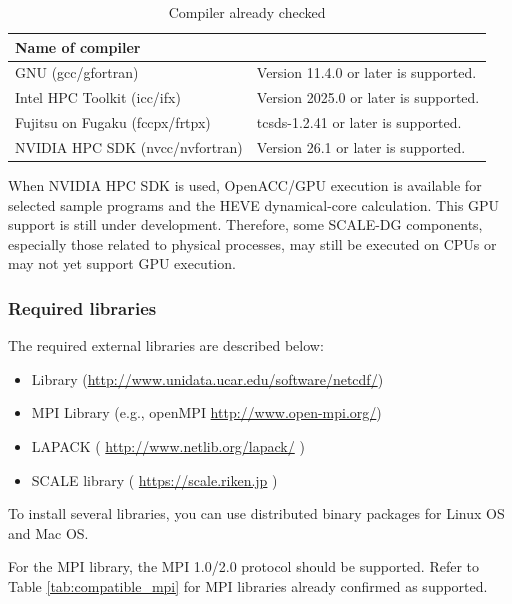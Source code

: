 \begin{table}[tb]
\begin{center}
\caption{Compiler already checked}
\begin{tabularx}{150mm}{|l|X|} \hline
 \rowcolor[gray]{0.9} Name of compiler &  \\ \hline
  GNU (gcc/gfortran)    & Version 11.4.0 or later is supported. \\ \hline
  Intel HPC Toolkit (icc/ifx)     & Version 2025.0 or later is supported. \\ \hline
  Fujitsu on Fugaku (fccpx/frtpx) & tcsds-1.2.41 or later is supported. \\ \hline
  NVIDIA HPC SDK (nvcc/nvfortran) & Version 26.1 or later is supported. \\ \hline
\end{tabularx}
\label{tab:compatible_compiler}
\end{center}
\end{table}

When NVIDIA HPC SDK is used, OpenACC/GPU execution is available for selected sample programs and the HEVE dynamical-core calculation. 
This GPU support is still under development. Therefore, some SCALE-DG components, especially those related to physical processes, may still be executed on CPUs or may not yet support GPU execution.


\subsubsection{Required libraries}\label{sec:inst_env}

The required external libraries are described below:
\begin{itemize}
\item {\netcdf} Library (\url{http://www.unidata.ucar.edu/software/netcdf/})
\item MPI Library (e.g., openMPI \url{http://www.open-mpi.org/})
\item LAPACK ( \url{http://www.netlib.org/lapack/} )
\item SCALE library ( \url{https://scale.riken.jp} )
\end{itemize}

To install several libraries, 
you can use distributed binary packages for Linux OS and Mac OS.

For the MPI library, the MPI 1.0/2.0 protocol should be supported.  
Refer to Table \ref{tab:compatible_mpi} for MPI libraries already confirmed as supported.

